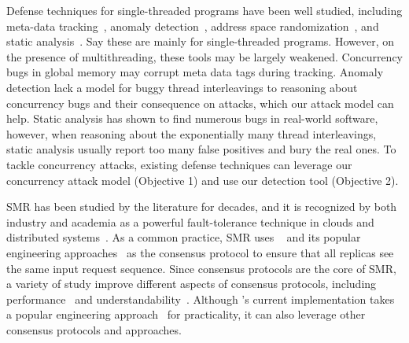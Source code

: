  Defense techniques for 
single-threaded programs have been well studied, including meta-data 
tracking~\cite{taintdroid:osdi10, lift:micro06, myers:information, 
valgrind:pldi}, anomaly 
detection~\cite{taskrecycling:ppopp90,schonberg:pldi89}, address space 
randomization~\cite{ aslr-fail:ccs04}, and static 
analysis~\cite{seth:pldi,engler:vmcai,wagner:syscall:ids,coverity:cacm, 
klee:osdi08}.
Say these are mainly for single-threaded programs. However, on the presence of 
multithreading, these tools may be largely weakened. Concurrency 
bugs in global memory may corrupt meta data tags during tracking. Anomaly 
detection lack a model for buggy thread interleavings to reasoning about 
concurrency bugs and their consequence on attacks, which our attack model can 
help. Static analysis has shown to find numerous bugs in real-world software, 
however, when reasoning about the exponentially many thread interleavings, 
static analysis usually report too many false positives and bury the real 
ones. To tackle concurrency attacks, existing defense techniques can leverage 
our concurrency attack model (Objective 1) and use our detection tool 
(Objective 2).

  SMR has been studied by the literature 
for decades, and it is recognized by both industry and academia as a powerful 
fault-tolerance technique in clouds and distributed 
systems~\cite{lamportclock,smr:tutorial}. As a common practice, SMR uses 
\paxos~\cite{paxos,paxos:simple,paxos:complex} and its popular engineering 
approaches~\cite{paxos:live,paxos:practical} as the consensus protocol to 
ensure that all replicas see the same input request sequence. Since consensus 
protocols are the core of SMR, a variety of study improve different aspects of 
consensus protocols, including performance~\cite{epaxos:sosp13,paxos:fast} and 
understandability~\cite{raft:usenix14}. Although \xxx's current implementation 
takes a popular engineering approach~\cite{paxos:practical} for practicality, 
it can also leverage other consensus protocols and approaches.

